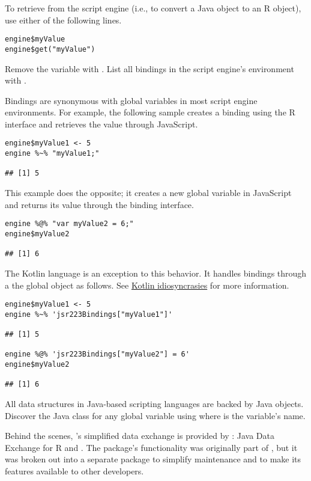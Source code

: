 To retrieve  from the script engine (i.e., to convert a Java object to an R object), use either of the following lines.

\begin{verbatim}
engine$myValue
engine$get("myValue")
\end{verbatim}

Remove the  variable with . List all bindings in the script engine's environment with .

Bindings are synonymous with global variables in most script engine environments. For example, the following sample creates a binding using the R interface and retrieves the value through JavaScript.

\begin{verbatim}
engine$myValue1 <- 5
engine %~% "myValue1;"

## [1] 5
\end{verbatim}
This example does the opposite; it creates a new global variable in JavaScript and returns its value through the  binding interface.
\begin{verbatim}
engine %@% "var myValue2 = 6;"
engine$myValue2

## [1] 6
\end{verbatim}
The Kotlin language is an exception to this behavior. It handles bindings through a the global object  as follows. See \hyperlink{kotlinidiosyncrasies}{Kotlin idiosyncrasies} for more information.

\begin{verbatim}
engine$myValue1 <- 5
engine %~% 'jsr223Bindings["myValue1"]'

## [1] 5

engine %@% 'jsr223Bindings["myValue2"] = 6'
engine$myValue2

## [1] 6
\end{verbatim}

All data structures in Java-based scripting languages are backed by Java objects. Discover the Java class for any global variable using   where  is the variable's name.

Behind the scenes, 's simplified data exchange is provided by : Java Data Exchange for R and . The  package's functionality was originally part of , but it was broken out into a separate package to simplify maintenance and to make its features available to other developers.

